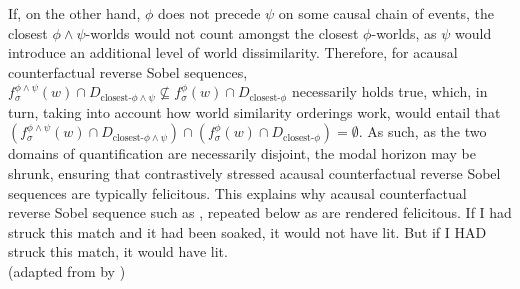 If, on the other hand, $\phi$ does not precede $\psi$ on some causal chain of events, the closest $\phi\land\psi$-worlds would not count amongst the closest $\phi$-worlds, as $\psi$ would introduce an additional level of world dissimilarity. Therefore, for acausal counterfactual reverse Sobel sequences, $f^{\phi\land\psi}_\sigma(w)\cap D_{\text{closest-}\phi\land\psi}\not\subseteq f^{\phi}_\sigma(w)\cap D_{\text{closest-}\phi}$ necessarily holds true, which, in turn, taking into account how world similarity orderings work, would entail that $(f^{\phi\land\psi}_\sigma(w)\cap D_{\text{closest-}\phi\land\psi})\cap(f^{\phi}_\sigma(w)\cap D_{\text{closest-}\phi})=\emptyset$. As such, as the two domains of quantification are necessarily disjoint, the modal horizon may be shrunk, ensuring that contrastively stressed acausal counterfactual reverse Sobel sequences are typically felicitous. This explains why acausal counterfactual reverse Sobel sequence such as , repeated below as  are rendered felicitous.
\ex{}If I had struck this match and it had been soaked, it would not have lit. But if I \MakeUppercase{had} struck this match, it would have lit.\\%
\emptyfill(adapted from \textcite[p.~106]{Stalnaker1968} by \textcite[p.~487]{Lewis2018})
\xe

